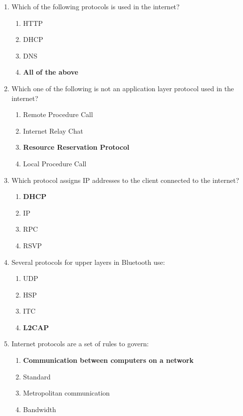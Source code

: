 \documentclass{article}
\begin{document}
\begin{enumerate}[label=\arabic*.]
    \item Which of the following protocols is used in the internet?
          \begin{enumerate}
              \item HTTP
              \item DHCP
              \item DNS
              \item \textbf{All of the above}
          \end{enumerate}

    \item Which one of the following is not an application layer protocol used in the internet?
          \begin{enumerate}
              \item Remote Procedure Call
              \item Internet Relay Chat
              \item \textbf{Resource Reservation Protocol}
              \item Local Procedure Call
          \end{enumerate}

    \item Which protocol assigns IP addresses to the client connected to the internet?
          \begin{enumerate}
              \item \textbf{DHCP}
              \item IP
              \item RPC
              \item RSVP
          \end{enumerate}

    \item Several protocols for upper layers in Bluetooth use:
          \begin{enumerate}
              \item UDP
              \item HSP
              \item ITC
              \item \textbf{L2CAP}
          \end{enumerate}

    \item Internet protocols are a set of rules to govern:
          \begin{enumerate}
              \item \textbf{Communication between computers on a network}
              \item Standard
              \item Metropolitan communication
              \item Bandwidth
          \end{enumerate}


\end{enumerate}
\end{document}
